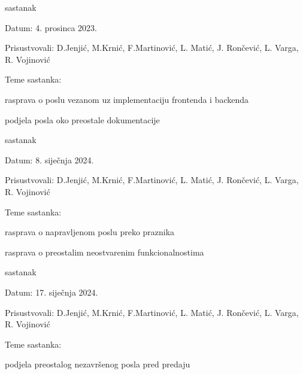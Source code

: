 \begin{packed_enum}
			
			\item  sastanak
			\item[] \begin{packed_item}

			

				\item Datum: 4. prosinca 2023.

				\item Prisustvovali: D.Jenjić, M.Krnić, F.Martinović, L. Matić, J. Rončević, L. Varga, R. Vojinović
				\item Teme sastanka:
				\begin{packed_item}
					\item  rasprava o poslu vezanom uz implementaciju frontenda i backenda
					\item  podjela posla oko preostale dokumentacije
				\end{packed_item}
			\end{packed_item}
			
			\item  sastanak
			\item[] \begin{packed_item}
				\item Datum: 8. siječnja 2024.
				\item Prisustvovali: D.Jenjić, M.Krnić, F.Martinović, L. Matić, J. Rončević, L. Varga, R. Vojinović
				\item Teme sastanka:
				\begin{packed_item}
					\item  rasprava o napravljenom poslu preko praznika
					\item  rasprava o preostalim neostvarenim funkcionalnostima 
					
				\end{packed_item}
			\end{packed_item}
			
			\item  sastanak
			\item[] \begin{packed_item}
				\item Datum: 17. siječnja 2024.
				\item Prisustvovali: D.Jenjić, M.Krnić, F.Martinović, L. Matić, J. Rončević, L. Varga, R. Vojinović
				\item Teme sastanka:
				\begin{packed_item}
					\item  podjela preostalog nezavršenog posla pred predaju
					

\end{packed_item}
\end{packed_item}
\end{packed_enum}
